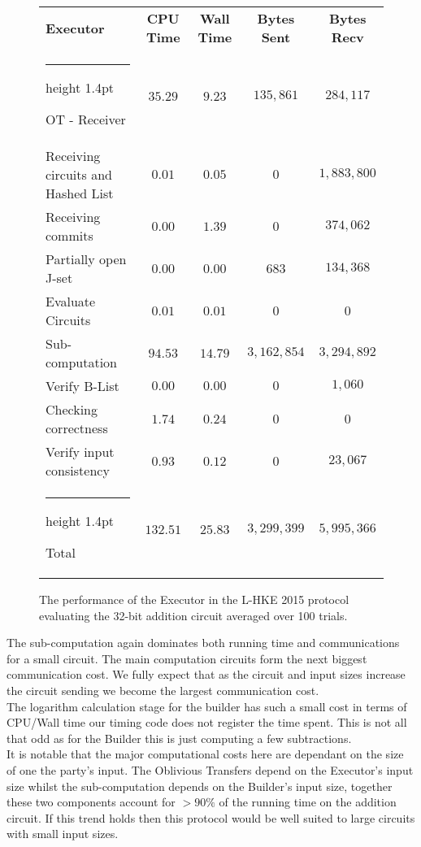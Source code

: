 \documentclass[11pt]{article} %
\makeatletter
\newcommand{\thickhline}{%
    \noalign {\ifnum 0=`}\fi \hrule height 1.4pt
    \futurelet \reserved@a \@xhline
}
\makeatother
\begin{document}
				\begin{figure}[!ht]
					\begin{tabular}{| p{4.3cm} | c c c c |}
						\hline
						\textbf{Executor} & \textbf{CPU Time} & \textbf{Wall Time} & \textbf{Bytes Sent} & \textbf{Bytes Recv} \\
						\thickhline
						OT - Receiver & $35.29$ & $9.23$ & $135,861$ & $284,117$ \\
						\hline
						Receiving circuits and Hashed List & $0.01$ & $0.05$ & $0$ & $1,883,800$ \\
						\hline
						Receiving commits & $0.00$ & $1.39$ & $0$ & $374,062$ \\
						\hline
						Partially open J-set & $0.00$ & $0.00$ & $683$ & $134,368$ \\
						\hline
						Evaluate Circuits & $0.01$ & $0.01$ & $0$ & $0$ \\
						\hline
						Sub-computation & $94.53$ & $14.79$ & $3,162,854$ & $3,294,892$ \\
						\hline
						Verify B-List & $0.00$ & $0.00$ & $0$ & $1,060$ \\
						\hline
						Checking correctness & $1.74$ & $0.24$ & $0$ & $0$ \\
						\hline
						Verify input consistency & $0.93$ & $0.12$ & $0$ & $23,067$ \\
						\thickhline
						Total & $132.51$ & $25.83$ & $3,299,399$ & $5,995,366$ \\
						\hline
					\end{tabular}
					\caption{The performance of the Executor in the L-HKE 2015 protocol evaluating the 32-bit addition circuit averaged over 100 trials. \label{table:L-HKE_2015_Add_Executor}}
				\end{figure}
				\FloatBarrier

				The sub-computation again dominates both running time and communications for a small circuit. The main computation circuits form the next biggest communication cost. We fully expect that as the circuit and input sizes increase the circuit sending we become the largest communication cost.\\

				The logarithm calculation stage for the builder has such a small cost in terms of CPU/Wall time our timing code does not register the time spent. This is not all that odd as for the Builder this is just computing a few subtractions.\\

				It is notable that the major computational costs here are dependant on the size of one the party's input. The Oblivious Transfers depend on the Executor's input size whilst the sub-computation depends on the Builder's input size, together these two components account for $>90\%$ of the running time on the addition circuit. If this trend holds then this protocol would be well suited to large circuits with small input sizes.\\
\end{document}

